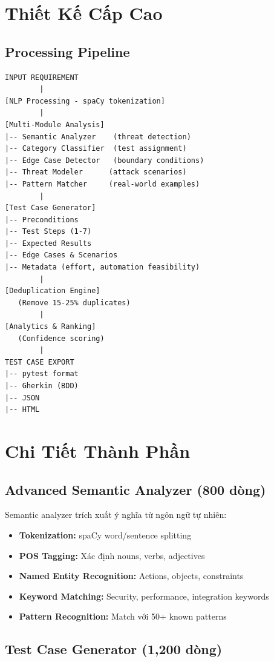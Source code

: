 \documentclass[12pt,oneside]{report}
\begin{document}
\section{Thiết Kế Cấp Cao}

\subsection{Processing Pipeline}

\begin{verbatim}
INPUT REQUIREMENT
        |
[NLP Processing - spaCy tokenization]
        |
[Multi-Module Analysis]
|-- Semantic Analyzer    (threat detection)
|-- Category Classifier  (test assignment)
|-- Edge Case Detector   (boundary conditions)
|-- Threat Modeler      (attack scenarios)
|-- Pattern Matcher     (real-world examples)
        |
[Test Case Generator]
|-- Preconditions
|-- Test Steps (1-7)
|-- Expected Results
|-- Edge Cases & Scenarios
|-- Metadata (effort, automation feasibility)
        |
[Deduplication Engine]
   (Remove 15-25% duplicates)
        |
[Analytics & Ranking]
   (Confidence scoring)
        |
TEST CASE EXPORT
|-- pytest format
|-- Gherkin (BDD)
|-- JSON
|-- HTML
\end{verbatim}

\section{Chi Tiết Thành Phần}

\subsection{Advanced Semantic Analyzer (800 dòng)}

Semantic analyzer trích xuất ý nghĩa từ ngôn ngữ tự nhiên:

\begin{itemize}
    \item \textbf{Tokenization:} spaCy word/sentence splitting
    \item \textbf{POS Tagging:} Xác định nouns, verbs, adjectives
    \item \textbf{Named Entity Recognition:} Actions, objects, constraints
    \item \textbf{Keyword Matching:} Security, performance, integration keywords
    \item \textbf{Pattern Recognition:} Match với 50+ known patterns
\end{itemize}

\subsection{Test Case Generator (1,200 dòng)}
\end{document}
